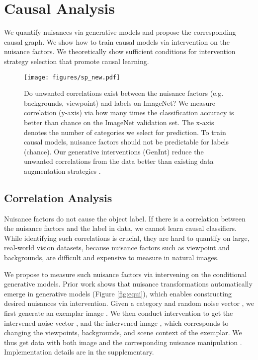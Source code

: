 \documentclass[final]{cvpr}
\begin{document}
 \section{Causal Analysis}
We quantify nuisances via generative models and propose the corresponding causal graph. We show how to train causal models via intervention on the nuisance factors. We theoretically show sufficient conditions for intervention strategy selection that promote causal learning.


\begin{figure}[t]
  \centering
  \vspace{-5mm}
  \texttt{[image: figures/sp\_new.pdf]}
  \vspace{-5mm}
  \caption{Do unwanted correlations exist between the nuisance factors (e.g. backgrounds, viewpoint) and labels on ImageNet? 
  We measure correlation (y-axis) via how many times the classification accuracy is better than chance on the ImageNet validation set. 
  The x-axis denotes the number of categories we select for prediction. To train causal models, nuisance factors should not be predictable for labels (chance). Our generative interventions (GenInt) reduce the unwanted correlations from the data better than existing data augmentation strategies \cite{zhang2017mixup, cubuk2018autoaugment, imagenetbiased, CAS}.}
   \vspace{-5mm}
  \label{fig:spurious_measure}
\end{figure}

\subsection{Correlation Analysis}\label{sec:corr}




Nuisance factors do not cause the object label. If there is a correlation between the nuisance factors and the label in data, we cannot learn causal classifiers. While identifying such correlations is crucial, they are hard to quantify on large, real-world vision datasets, because nuisance factors such as viewpoint and backgrounds, are difficult and expensive to measure in natural images. 



We propose to measure such nuisance factors via intervening on the conditional generative models.
Prior work \cite{hrknen2020ganspace, jahanian2019steerability} shows that nuisance transformations automatically emerge in generative models (Figure \ref{fig:equi}), which enables constructing desired nuisances via intervention. Given a category  and random noise vector , we first generate an exemplar image . We then conduct intervention  to get the intervened noise vector , and the intervened image , which corresponds to changing the viewpoints, backgrounds, and scene context of the exemplar. We thus get data with both image  and the corresponding nuisance manipulation . Implementation details are in the supplementary.  
\end{document}
